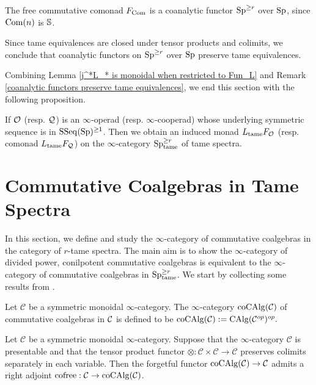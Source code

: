 \begin{example}
    The free commutative comonad $F_{\operatorname{Com}}$ is a coanalytic functor
    $\operatorname{Sp}^{\geq r}$ over $\operatorname{Sp}$, since $\operatorname{Com}(n)$ is ${\mathbb{S}}$.
\end{example}

\begin{remark}
\label{coanalytic functors preserve tame equivalences}
	Since tame equivalences are closed under tensor products and colimits,
	we conclude that coanalytic functors on $\operatorname{Sp}^{\geq r}$ over $\operatorname{Sp}$ preserve tame equivalences. 
\end{remark}
Combining Lemma \ref{j^*L_* is monoidal when restricted to Fun_L} and Remark \ref{coanalytic functors preserve tame equivalences}, we end this section with the following proposition.
\begin{proposition}
\label{Induced Monads}
If ${\mathcal{O}}$ (resp. ${\mathcal{Q}}$) is an $\infty$-operad (resp. $\infty$-cooperad) whose underlying symmetric sequence is in $\operatorname{SSeq}(\operatorname{Sp})^{\geq 1}$.
Then we obtain an induced monad $L_{\operatorname{\operatorname{tame}}} F_{{\mathcal{O}}}$ (resp. comonad $L_{\operatorname{\operatorname{tame}}} F_{{\mathcal{Q}}}$) on the $\infty$-category $\operatorname{Sp}^{\geq r}_{\operatorname{\operatorname{tame}}}$ of tame spectra.
\end{proposition}

\section{Commutative Coalgebras in Tame Spectra}
\label{Commutative coalgebras in tame spectra}

In this section, we define and study the $\infty$-category of commutative coalgebras in the category of $r$-tame spectra. 
The main aim is to show the $\infty$-category of divided power, conilpotent commutative coalgebras is equivalent to the $\infty$-category of commutative coalgebras in $\operatorname{Sp}^{\geq r}_{\operatorname{\operatorname{tame}}}$.
We start by collecting some results from \cite{LurieEllipticI}.

\begin{definition}
    Let $\mathcal{C}$ be a symmetric monoidal $\infty$-category. The $\infty$-category $\operatorname{coCAlg}({\mathcal{C}})$ of commutative coalgebras in ${\mathcal{C}}$ is defined to be
    $
    \operatorname{coCAlg}({\mathcal{C}}):= \operatorname{CAlg}({\mathcal{C}}^{op})^{op}.
    $
\end{definition}



\begin{proposition}
\label{Cor 3.1.5. Ellip}
\cite[Corollary 3.1.5]{LurieEllipticI}
	Let $\mathcal{C}$ be a symmetric monoidal $\infty$-category. Suppose that the $\infty$-category $\mathcal{C}$ is presentable and that the tensor product functor $\otimes: \mathcal{C} \times \mathcal{C} \rightarrow \mathcal{C}$ preserves colimits separately in each variable. Then the forgetful functor $\operatorname{coCAlg}(\mathcal{C}) \rightarrow \mathcal{C}$ admits a right adjoint $\operatorname{cofree}: \mathcal{C} \rightarrow \operatorname{coCAlg}(\mathcal{C})$.
\end{proposition}


